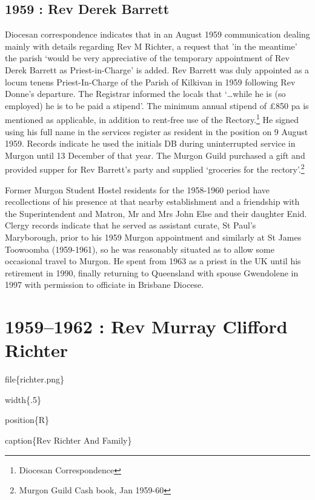 \hypertarget{rev-derek-barrett}{%
\section{1959 : Rev Derek Barrett}\label{rev-derek-barrett}}

Diocesan correspondence indicates that in an August 1959 communication
dealing mainly with details regarding Rev M Richter, a request that 'in
the meantime' the parish `would be very appreciative of the temporary
appointment of Rev Derek Barrett as Priest-in-Charge' is added. Rev
Barrett was duly appointed as a locum tenens Priest-In-Charge of the
Parish of Kilkivan in 1959 following Rev Donne's departure. The
Registrar informed the locals that `\ldots while he is (so employed) he
is to be paid a stipend'. The minimum annual stipend of £850 pa is
mentioned as applicable, in addition to rent-free use of the
Rectory.\footnote{Diocesan Correspondence} He signed using his full name
in the services register as resident in the position on 9 August 1959.
Records indicate he used the initials DB during uninterrupted service in
Murgon until 13 December of that year. The Murgon Guild purchased a gift
and provided supper for Rev Barrett's party and supplied `groceries for
the rectory'.\footnote{Murgon Guild Cash book, Jan 1959-60}

Former Murgon Student Hostel residents for the 1958-1960 period have
recollections of his presence at that nearby establishment and a
friendship with the Superintendent and Matron, Mr and Mrs John Else and
their daughter Enid. Clergy records indicate that he served as assistant
curate, St Paul's Maryborough, prior to his 1959 Murgon appointment and
similarly at St James Toowoomba (1959-1961), so he was reasonably
situated as to allow some occasional travel to Murgon. He spent from
1963 as a priest in the UK until his retirement in 1990, finally
returning to Queensland with spouse Gwendolene in 1997 with permission
to officiate in Brisbane Diocese.

\hypertarget{rev-murray-clifford-richter}{%
\chapter{1959--1962 : Rev Murray Clifford
Richter}\label{rev-murray-clifford-richter}}

file\{richter.png\}

width\{.5\}

position\{R\}

caption\{Rev Richter And Family\}

